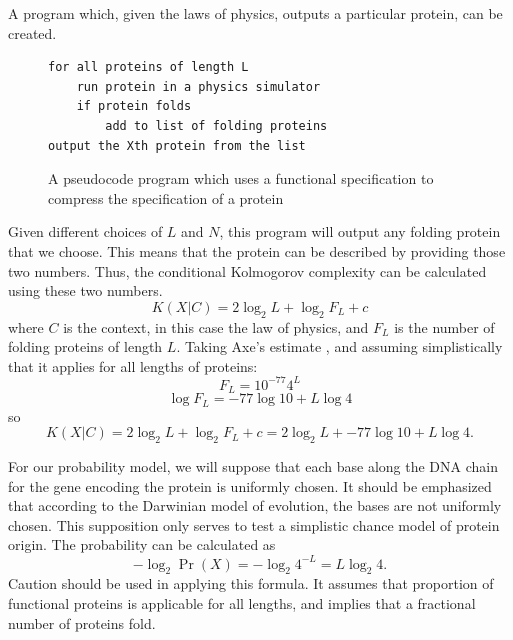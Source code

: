 A program which, given the laws of physics, outputs a particular protein, can be created.
\begin{figure}[H]
\begin{mdframed}
\begin{verbatim}
for all proteins of length L
    run protein in a physics simulator
    if protein folds
        add to list of folding proteins
output the Xth protein from the list
\end{verbatim}
\end{mdframed}
\caption{A pseudocode program which uses a functional specification to compress the specification of a protein}
\end{figure}

Given different choices of $L$ and $N$, this program will output any folding protein that we choose.
This means that the protein can be described by providing those two numbers.  Thus, the conditional Kolmogorov complexity can be calculated using these two numbers.
\begin{equation}
    K(X|C) = 2 \log_2 L + \log_2 F_L + c
\end{equation} where $C$ is the context, in this case the law of physics,
and $F_L$ is the number of folding proteins of length $L$.
Taking Axe's estimate \citep{axe2004}, and assuming simplistically that it applies for all lengths of proteins:
\begin{equation}
    F_L = 10^{-77} 4^L 
\end{equation}
\begin{equation}
    \log F_L = -77 \log 10 + L \log 4
\end{equation}
so
\begin{equation}
    K(X|C) = 2 \log_2 L + \log_2 F_L + c = 2 \log_2 L + -77 \log 10  + L \log 4 \mbox{.}
\end{equation}

For our probability model, we will suppose that each base along the DNA chain for the gene encoding the protein is uniformly chosen.
It should be emphasized that according to the Darwinian model of evolution, the bases are not uniformly chosen.
This supposition only serves to test a simplistic chance model of protein origin.
The probability can be calculated as
\begin{equation}
    -\log_2 \Pr(X) =  -\log_2 4^{-L} = L \log_2 4 \mbox{.}
\end{equation}
Caution should be used in applying this formula.
It assumes that proportion of functional proteins is applicable for all lengths, and implies that a fractional number of proteins fold.

